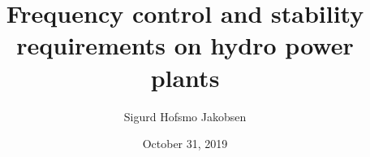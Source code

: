 \title{Frequency control and stability requirements on hydro power plants}
\author{Sigurd Hofsmo Jakobsen}
\date{October 31, 2019}

\begin{frame}
  \titlepage
\end{frame}
